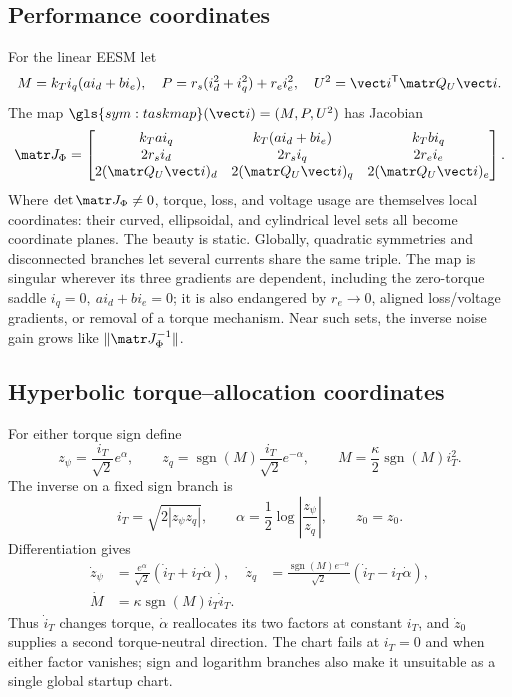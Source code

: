 \subsection{Performance coordinates}

For the linear EESM let
\[
 M=k_Ti_q(ai_d+bi_e),\quad
 P=r_s(i_d^2+i_q^2)+r_ei_e^2,\quad
 U^2=\vect i^{\mathsf T}\matr Q_U\vect i.
\]
The map \(\gls{sym:taskmap}(\vect i)=(M,P,U^2)\) has Jacobian
\begin{equation}
 \matr J_\Phi=
 \begin{bmatrix}
 k_Tai_q & k_T(ai_d+bi_e) & k_Tbi_q\\
 2r_si_d&2r_si_q&2r_ei_e\\
 2(\matr Q_U\vect i)_d&2(\matr Q_U\vect i)_q&
 2(\matr Q_U\vect i)_e
 \end{bmatrix}.
 \label{eq:performance-jacobian}
\end{equation}
Where \(\det\matr J_\Phi\neq0\), torque, loss, and voltage usage are themselves
local coordinates: their curved, ellipsoidal, and cylindrical level sets all
become coordinate planes. The beauty is static. Globally, quadratic symmetries
and disconnected branches let several currents share the same triple. The map
is singular wherever its three gradients are dependent, including the
zero-torque saddle \(i_q=0,\ ai_d+bi_e=0\); it is also endangered by
\(r_e\to0\), aligned loss/voltage gradients, or removal of a torque mechanism.
Near such sets, the inverse noise gain grows like
\(\|\matr J_\Phi^{-1}\|\).

\subsection{Hyperbolic torque--allocation coordinates}

For either torque sign define
\begin{equation}
 z_\psi=\frac{i_T}{\sqrt2}e^\alpha,\qquad
 z_q=\operatorname{sgn}(M)\frac{i_T}{\sqrt2}e^{-\alpha},\qquad
 M=\frac{\kappa}{2}\operatorname{sgn}(M)i_T^2.
 \label{eq:signed-hyperbolic-chart}
\end{equation}
The inverse on a fixed sign branch is
\[
 i_T=\sqrt{2|z_\psi z_q|},\qquad
 \alpha=\frac12\log\left|\frac{z_\psi}{z_q}\right|,\qquad z_0=z_0.
\]
Differentiation gives
\begin{align}
 \dot z_\psi&=\frac{e^\alpha}{\sqrt2}
  (\dot i_T+i_T\dot\alpha),&
 \dot z_q&=\frac{\operatorname{sgn}(M)e^{-\alpha}}{\sqrt2}
  (\dot i_T-i_T\dot\alpha),\\
 \dot M&=\kappa\operatorname{sgn}(M)i_T\dot i_T.
 \label{eq:hyperbolic-rates-representation}
\end{align}
Thus \(\dot i_T\) changes torque, \(\dot\alpha\) reallocates its two factors at
constant \(i_T\), and \(\dot z_0\) supplies a second torque-neutral direction.
The chart fails at \(i_T=0\) and when either factor vanishes; sign and logarithm
branches also make it unsuitable as a single global startup chart.

